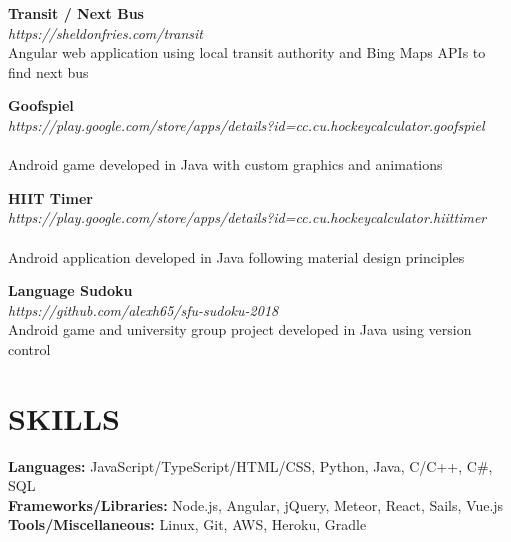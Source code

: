 \documentclass[margin,line]{resume}
\begin{document}
\begin{resume}
    \textbf{\listing Transit / Next Bus} \vspace{1mm}\\
    \textsl{https://sheldonfries.com/transit} \vspace{1mm}\\
    Angular web application using local transit authority and Bing Maps APIs to find next bus

    \textbf{\listing Goofspiel} \vspace{1mm}\\
    \textsl{https://play.google.com/store/apps/details?id=cc.cu.hockeycalculator.goofspiel} \vspace{-3mm}\\\vspace{-1mm}\\
    Android game developed in Java with custom graphics and animations
    
    \textbf{\listing HIIT Timer} \vspace{1mm}\\ \textsl{https://play.google.com/store/apps/details?id=cc.cu.hockeycalculator.hiittimer} \vspace{-3mm}\\\vspace{-1mm}\\
    Android application developed in Java following material design principles
    
    \textbf{\listing Language Sudoku} \vspace{1mm}\\
    \textsl{https://github.com/alexh65/sfu-sudoku-2018} \vspace{1mm}\\
    Android game and university group project developed in Java using version control

    \vspace{-1mm}

\sectionline

    \section{\mysidestyle \textbf{\large{S}\small{KILLS}}}

    \textbf{Languages:} JavaScript/TypeScript/HTML/CSS, Python, Java, C/C++, C\#, SQL\\
    \textbf{Frameworks/Libraries:} Node.js, Angular, jQuery, Meteor, React, Sails, Vue.js\\
    \textbf{Tools/Miscellaneous:} Linux, Git, AWS, Heroku, Gradle


\end{resume}
\end{document}
